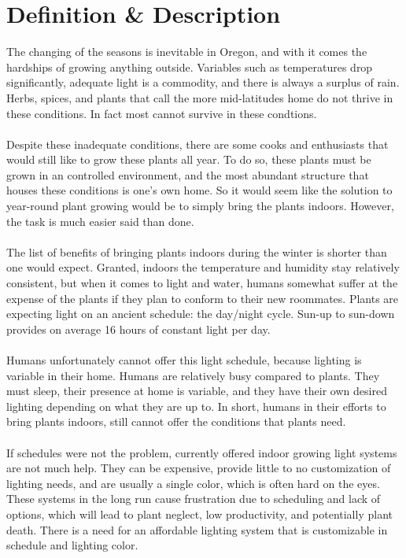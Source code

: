 \documentclass[letterpaper,10pt,draftclsnofoot,onecolumn]{article}
\begin{document}
	\section*{Definition \& Description}
	The changing of the seasons is inevitable in Oregon, and with it comes the hardships of growing anything outside. Variables such as temperatures drop significantly, adequate light is a commodity, and there is always a surplus of rain.  Herbs, spices, and plants that call the more mid-latitudes home do not thrive in these conditions.  In fact most cannot survive in these condtions.
\\
\\
	Despite these inadequate conditions, there are some cooks and enthusiasts that would still like to grow these plants all year.  To do so, these plants must be grown in an controlled environment, and the most abundant structure that houses these conditions is one's own home.   So it would seem like the solution to year-round plant growing would be to simply bring the plants indoors.  However, the task is much easier said than done.
\\
\\
	The list of benefits of bringing plants indoors during the winter is shorter than one would expect.  Granted, indoors the temperature and humidity stay relatively consistent, but when it comes to light and water, humans somewhat suffer at the expense of the plants if they plan to conform to their new roommates.  Plants are expecting light on an ancient schedule: the day/night cycle.  Sun-up to sun-down provides on average 16 hours of constant light per day.
\\
\\
	Humans unfortunately cannot offer this light schedule, because lighting is variable in their home.  Humans are relatively busy compared to plants.  They must sleep, their presence at home is variable, and they have their own desired lighting depending on what they are up to.  In short, humans in their efforts to bring plants indoors, still cannot offer the conditions that plants need.
\\
\\
	If schedules were not the problem, currently offered indoor growing light systems are not much help.  They can be expensive, provide little to no customization of lighting needs, and are usually a single color, which is often hard on the eyes.  These systems in the long run cause frustration due to scheduling and lack of options, which will lead to plant neglect, low productivity, and potentially plant death.  There is a need for an affordable lighting system that is customizable in schedule and lighting color.
\end{document}
